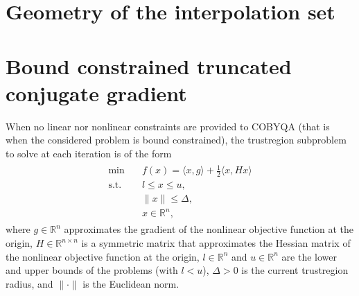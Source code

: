 \documentclass[letterpaper,10pt,english]{sphinxmanual}
\newcommand{\norm}[2][]{#1\lVert#2#1\rVert}
\newcommand{\inner}[2][]{#1\langle#2#1\rangle}
\def\R{\ensuremath{\mathds{R}}}
\begin{document}
\section{Geometry of the interpolation set}
\label{\detokenize{algo/linalg.altmov:geometry-of-the-interpolation-set}}\label{\detokenize{algo/linalg.altmov:linalg-altmov}}\label{\detokenize{algo/linalg.altmov::doc}}

\section{Bound constrained truncated conjugate gradient}
\label{\detokenize{algo/linalg.bvtcg:bound-constrained-truncated-conjugate-gradient}}\label{\detokenize{algo/linalg.bvtcg:linalg-bvtcg}}\label{\detokenize{algo/linalg.bvtcg::doc}}
\sphinxAtStartPar
When no linear nor nonlinear constraints are provided to COBYQA (that is when
the considered problem is bound constrained), the trust\sphinxhyphen{}region subproblem to
solve at each iteration is of the form
\begin{equation}\label{equation:algo/linalg.bvtcg:bvtcg}
\begin{split}\begin{array}{ll}
    \min        & \quad f(x) = \inner{x, g} + \frac{1}{2} \inner{x, H x}\\
    \text{s.t.} & \quad l \le x \le u,\\
                & \quad \norm{x} \le \Delta,\\
                & \quad x \in \R^n,
\end{array}\end{split}
\end{equation}
\sphinxAtStartPar
where \(g \in \R^n\) approximates the gradient of the nonlinear objective
function at the origin, \(H \in \R^{n \times n}\) is a symmetric matrix
that approximates the Hessian matrix of the nonlinear objective function at the
origin, \(l \in \R^n\) and \(u \in \R^n\) are the lower and upper
bounds of the problems (with \(l < u\)), \(\Delta > 0\) is the current
trust\sphinxhyphen{}region radius, and \(\norm{\cdot}\) is the Euclidean norm.
\end{document}
